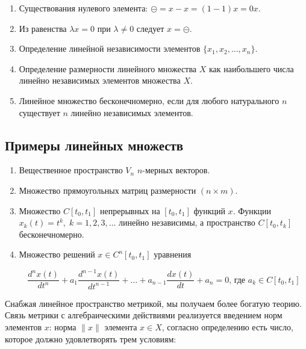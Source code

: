 \documentclass[12pt,a4paper,titlepage,oneside]{book}
\theoremstyle{definition}
\theoremstyle{plain}
\theoremstyle{remark}
\theoremstyle{remark}
\theoremstyle{remark}
\theoremstyle{remark}
\theoremstyle{plain}
\theoremstyle{plain}
\begin{document}
\begin{enumerate}

	\item Существования нулевого элемента: $\circleddash=x-x=(1-1)x=0x$.

	\item Из равенства $\lambda x=0$ при $\lambda\ne0$ следует $x=\circleddash$.

	\item Определение линейной независимости элементов $\{x_1,x_2, \ldots, x_n\}$.

	\item Определение размерности линейного множества $X$ как наибольшего числа линейно независимых элементов множества $X$.

	\item Линейное множество бесконечномерно, если для любого натурального $n$ существует $n$ линейно независимых элементов.

\end{enumerate}

\subsection*{Примеры линейных множеств}

\begin{enumerate}

	\item Вещественное пространство $V_n$ $n$-мерных векторов.

	\item Множество прямоугольных матриц размерности $(n\times m)$.

	\item Множество $C[t_0,t_1]$ непрерывных на $[t_0,t_1]$ функций $x$. Функции $x_k(t)=t^k,\; k=1,2,3,\ldots$ линейно независимы, а пространство $C[t_0,t_k]$ бесконечномерно.

	\item Множество решений $x\in C^n[t_0,t_1]$ уравнения

	\begin{equation*}
	\frac{d^nx(t)}{dt^n}+a_1\frac{d^{n-1}x(t)}{dt^{n-1}}+\ldots+a_{n-1}\frac{dx(t)}{dt}+a_n=0 \mbox{, где } a_k\in C[t_0,t_1]
	\end{equation*}

\end{enumerate}


Снабжая линейное пространство метрикой, мы получаем более богатую теорию. Связь метрики с алгебраическими действиями реализуется введением норм элементов $x$: норма $\lVert x\rVert$ элемента $x\in X$, согласно определению есть число, которое должно удовлетворять трем условиям:
\end{document}

